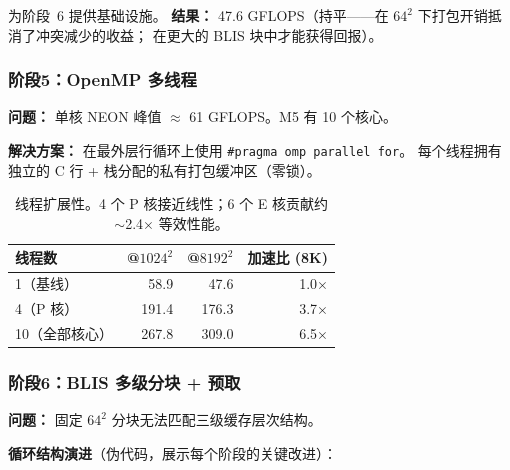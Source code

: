 \documentclass[11pt,a4paper]{article}
\begin{document}
为阶段~6 提供基础设施。
\textbf{结果：} 47.6 GFLOPS（持平——在 $64^2$ 下打包开销抵消了冲突减少的收益；
在更大的 BLIS 块中才能获得回报）。

\subsubsection{阶段5：OpenMP 多线程}

\textbf{问题：} 单核 NEON 峰值 $\approx$ 61 GFLOPS。M5 有 10 个核心。

\textbf{解决方案：} 在最外层行循环上使用 \texttt{\#pragma omp parallel for}。
每个线程拥有独立的 C 行 + 栈分配的私有打包缓冲区（零锁）。

\begin{table}[H]\centering
\begin{tabular}{l|rr|r}
\toprule 线程数 & @$1024^2$ & @$8192^2$ & 加速比 (8K) \\
\midrule
1（基线）      & 58.9  & 47.6  & 1.0$\times$ \\
4（P 核）      & 191.4 & 176.3 & 3.7$\times$ \\
10（全部核心） & 267.8 & 309.0 & 6.5$\times$ \\
\bottomrule
\end{tabular}
\caption{线程扩展性。4 个 P 核接近线性；6 个 E 核贡献约 $\sim$2.4$\times$ 等效性能。}
\end{table}

\subsubsection{阶段6：BLIS 多级分块 + 预取}

\textbf{问题：} 固定 $64^2$ 分块无法匹配三级缓存层次结构。

\textbf{循环结构演进}（伪代码，展示每个阶段的关键改进）：
\end{document}
